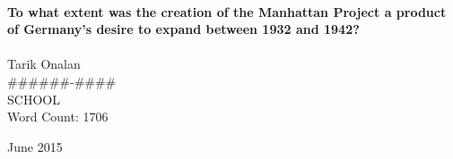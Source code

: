 \begin{titlepage}
    \begin{center}
        \HRule \\[0.4cm]
        { \large \bfseries To what extent was the creation of the Manhattan Project a product of Germany's desire to expand between 1932 and 1942? \\[0.4cm] }
        \HRule \\[1.5cm]

        Tarik Onalan
        \\[0.4cm]
        \#\#\#\#\#\#-\#\#\#\#
        \\[0.4cm]
        SCHOOL
        \\[0.4cm]
        Word Count: 1706
        \vfill

        {\large June 2015}
    \end{center}
\end{titlepage}
